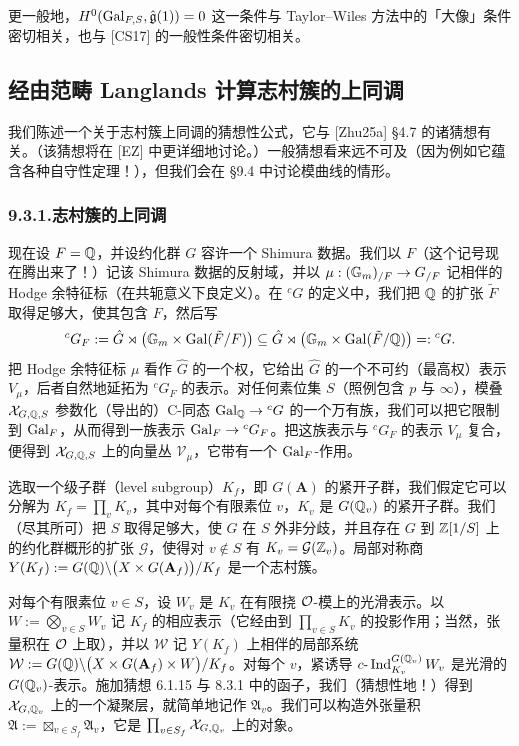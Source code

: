 更一般地，$H^0(\operatorname{Gal}_{F,S},\hat{\mathfrak g}(1))=0$ 这一条件与 Taylor--Wiles 方法中的「大像」条件密切相关，也与 [CS17] 的一般性条件密切相关。

\subsection{经由范畴 Langlands 计算志村簇的上同调}
我们陈述一个关于志村簇上同调的猜想性公式，它与 [Zhu25a] §4.7 的诸猜想有关。（该猜想将在 [EZ] 中更详细地讨论。）一般猜想看来远不可及（因为例如它蕴含各种自守性定理！），但我们会在 §9.4 中讨论模曲线的情形。

\subsubsection*{9.3.1.\quad 志村簇的上同调}
现在设 $F=\mathbb{Q}$，并设约化群 $G$ 容许一个 Shimura 数据。我们以 $F$（这个记号现在腾出来了！）记该 Shimura 数据的反射域，并以 $\mu:(\mathbb{G}_m)_{/F}\to G_{/F}$ 记相伴的 Hodge 余特征标（在共轭意义下良定义）。在 ${}^cG$ 的定义中，我们把 $\mathbb{Q}$ 的扩张 $\tilde F$ 取得足够大，使其包含 $F$，然后写
\[
{}^cG_F:=\hat G\rtimes\bigl(\mathbb{G}_m\times\operatorname{Gal}(\tilde F/F)\bigr)\subseteq\hat G\rtimes\bigl(\mathbb{G}_m\times\operatorname{Gal}(\tilde F/\mathbb{Q})\bigr)=:{}^cG.
\]
把 Hodge 余特征标 $\mu$ 看作 $\hat G$ 的一个权，它给出 $\hat G$ 的一个不可约（最高权）表示 $V_\mu$，后者自然地延拓为 ${}^cG_F$ 的表示。对任何素位集 $S$（照例包含 $p$ 与 $\infty$），模叠 $\mathcal{X}_{G,\mathbb{Q},S}$ 参数化（导出的）C-同态 $\operatorname{Gal}_{\mathbb{Q}}\to{}^cG$ 的一个万有族，我们可以把它限制到 $\operatorname{Gal}_F$，从而得到一族表示 $\operatorname{Gal}_F\to{}^cG_F$。把这族表示与 ${}^cG_F$ 的表示 $V_\mu$ 复合，便得到 $\mathcal{X}_{G,\mathbb{Q},S}$ 上的向量丛 $\mathcal V_\mu$，它带有一个 $\operatorname{Gal}_F$-作用。

选取一个级子群（level subgroup）$K_f$，即 $G(\mathbf A)$ 的紧开子群，我们假定它可以分解为 $K_f=\prod_vK_v$，其中对每个有限素位 $v$，$K_v$ 是 $G(\mathbb{Q}_v)$ 的紧开子群。我们（尽其所可）把 $S$ 取得足够大，使 $G$ 在 $S$ 外非分歧，并且存在 $G$ 到 $\mathbb{Z}[1/S]$ 上的约化群概形的扩张 $\mathcal G$，使得对 $v\notin S$ 有 $K_v=\mathcal G(\mathbb{Z}_v)$。局部对称商 $Y(K_f):=G(\mathbb{Q})\backslash\bigl(X\times G(\mathbf A_f)\bigr)/K_f$ 是一个志村簇。

对每个有限素位 $v\in S$，设 $W_v$ 是 $K_v$ 在有限挠 $\mathcal{O}$-模上的光滑表示。以 $W:=\bigotimes_{v\in S}W_v$ 记 $K_f$ 的相应表示（它经由到 $\prod_{v\in S}K_v$ 的投影作用；当然，张量积在 $\mathcal{O}$ 上取），并以 $\mathcal W$ 记 $Y(K_f)$ 上相伴的局部系统 $\mathcal W:=G(\mathbb{Q})\backslash\bigl(X\times G(\mathbf A_f)\times W\bigr)/K_f$。对每个 $v$，紧诱导 $c\text{-}\operatorname{Ind}_{K_v}^{G(\mathbb{Q}_v)}W_v$ 是光滑的 $G(\mathbb{Q}_v)$-表示。施加猜想 6.1.15 与 8.3.1 中的函子，我们（猜想性地！）得到 $\mathcal{X}_{G,\mathbb{Q}_v}$ 上的一个凝聚层，就简单地记作 $\mathfrak A_v$。我们可以构造外张量积 $\mathfrak A:=\boxtimes_{v\in S_f}\mathfrak A_v$，它是 $\prod_{v\in S_f}\mathcal{X}_{G,\mathbb{Q}_v}$ 上的对象。


